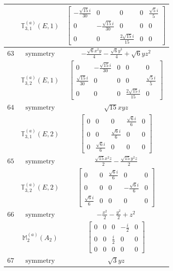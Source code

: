 \documentclass[fleqn,8pt,landscape]{jsarticle}
\begin{document}
\begin{longtable}{ccc}
$  $ & $ \mathbb{T}_{3,1}^{(a)}(E,1) $ & $ \begin{bmatrix} - \frac{\sqrt{15} i}{30} & 0 & 0 & 0 & \frac{\sqrt{5} i}{5} \\ 0 & - \frac{\sqrt{15} i}{30} & 0 & 0 & 0 \\ 0 & 0 & \frac{2 \sqrt{15} i}{15} & 0 & 0 \end{bmatrix} $ \\ \hline
$ 63 $ & $ \text{symmetry} $ & $ - \frac{\sqrt{6} x^{2} y}{4} - \frac{\sqrt{6} y^{3}}{4} + \sqrt{6} y z^{2} $ \\
$  $ & $ \mathbb{T}_{3,2}^{(a)}(E,1) $ & $ \begin{bmatrix} 0 & - \frac{\sqrt{15} i}{30} & 0 & 0 & 0 \\ \frac{\sqrt{15} i}{30} & 0 & 0 & 0 & \frac{\sqrt{5} i}{5} \\ 0 & 0 & 0 & \frac{2 \sqrt{15} i}{15} & 0 \end{bmatrix} $ \\ \hline
$ 64 $ & $ \text{symmetry} $ & $ \sqrt{15} x y z $ \\
$  $ & $ \mathbb{T}_{3,1}^{(a)}(E,2) $ & $ \begin{bmatrix} 0 & 0 & 0 & \frac{\sqrt{6} i}{6} & 0 \\ 0 & 0 & \frac{\sqrt{6} i}{6} & 0 & 0 \\ 0 & \frac{\sqrt{6} i}{6} & 0 & 0 & 0 \end{bmatrix} $ \\ \hline
$ 65 $ & $ \text{symmetry} $ & $ \frac{\sqrt{15} x^{2} z}{2} - \frac{\sqrt{15} y^{2} z}{2} $ \\
$  $ & $ \mathbb{T}_{3,2}^{(a)}(E,2) $ & $ \begin{bmatrix} 0 & 0 & \frac{\sqrt{6} i}{6} & 0 & 0 \\ 0 & 0 & 0 & - \frac{\sqrt{6} i}{6} & 0 \\ \frac{\sqrt{6} i}{6} & 0 & 0 & 0 & 0 \end{bmatrix} $ \\ \hline
$ 66 $ & $ \text{symmetry} $ & $ - \frac{x^{2}}{2} - \frac{y^{2}}{2} + z^{2} $ \\
$  $ & $ \mathbb{M}_{2}^{(a)}(A_{2}) $ & $ \begin{bmatrix} 0 & 0 & 0 & - \frac{i}{2} & 0 \\ 0 & 0 & \frac{i}{2} & 0 & 0 \\ 0 & 0 & 0 & 0 & 0 \end{bmatrix} $ \\ \hline
$ 67 $ & $ \text{symmetry} $ & $ \sqrt{3} y z $ \\

\end{longtable}
\end{document}

